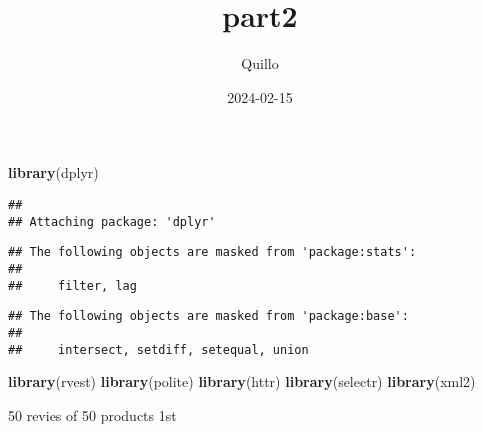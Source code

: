 \documentclass[
]{article}
\title{part2}
\author{Quillo}
\date{2024-02-15}
\newenvironment{Shaded}{\begin{snugshade}}{\end{snugshade}}
\newcommand{\FunctionTok}[1]{\textcolor[rgb]{0.13,0.29,0.53}{\textbf{#1}}}
\newcommand{\NormalTok}[1]{#1}
\begin{document}
\maketitle

\begin{Shaded}
\begin{Highlighting}[]
\FunctionTok{library}\NormalTok{(dplyr)}
\end{Highlighting}
\end{Shaded}

\begin{verbatim}
## 
## Attaching package: 'dplyr'
\end{verbatim}

\begin{verbatim}
## The following objects are masked from 'package:stats':
## 
##     filter, lag
\end{verbatim}

\begin{verbatim}
## The following objects are masked from 'package:base':
## 
##     intersect, setdiff, setequal, union
\end{verbatim}

\begin{Shaded}
\begin{Highlighting}[]
\FunctionTok{library}\NormalTok{(rvest)}
\FunctionTok{library}\NormalTok{(polite)}
\FunctionTok{library}\NormalTok{(httr)}
\FunctionTok{library}\NormalTok{(selectr)}
\FunctionTok{library}\NormalTok{(xml2)}
\end{Highlighting}
\end{Shaded}

50 revies of 50 products 1st
\end{document}
